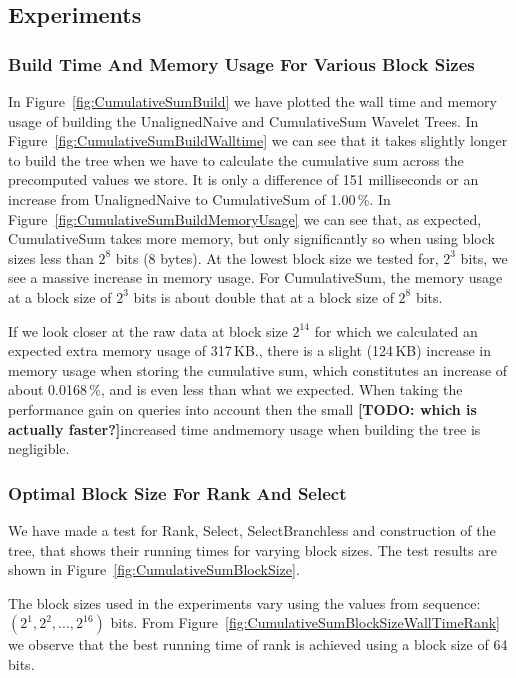 \subsection{Experiments}

\subsubsection{Build Time And Memory Usage For Various Block Sizes}
In Figure~\ref{fig:CumulativeSumBuild} we have plotted the wall time and memory usage of building the UnalignedNaive and CumulativeSum Wavelet Trees.
In Figure~\ref{fig:CumulativeSumBuildWalltime} we can see that it takes slightly longer to build the tree when we have to calculate the cumulative sum across the precomputed values we store.
It is only a difference of 151 milliseconds or an increase from UnalignedNaive to CumulativeSum of 1.00\,\%.
In Figure~\ref{fig:CumulativeSumBuildMemoryUsage} we can see that, as expected, CumulativeSum takes more memory, but only significantly so when using block sizes less than $2^8$ bits (8 bytes).
At the lowest block size we tested for, $2^3$ bits, we see a massive increase in memory usage.
For CumulativeSum, the memory usage at a block size of $2^3$ bits is about double that at a block size of $2^8$ bits.

If we look closer at the raw data at block size $2^{14}$ for which we calculated an expected extra memory usage of 317\,KB., there is a slight (124\,KB) increase in memory usage when storing the cumulative sum, which constitutes an increase of about 0.0168\,\%, and is even less than what we expected.
When taking the performance gain on queries into account then the small  \textbf{[TODO: which is actually faster?]}increased time andmemory usage when building the tree is negligible.





\subsubsection{Optimal Block Size For Rank And Select}
\label{sec:OptimalBlockSizeForRankAndSelect}
We have made a test for Rank, Select, SelectBranchless and construction of the tree, that shows their running times for varying block sizes.
The test results are shown in Figure~\ref{fig:CumulativeSumBlockSize}.


The block sizes used in the experiments vary using the values from sequence: $(2^1, 2^2, ..., 2^{16})$ bits.
From Figure~\ref{fig:CumulativeSumBlockSizeWallTimeRank} we observe that the best running time of rank is achieved using a block size of 64 bits. 

